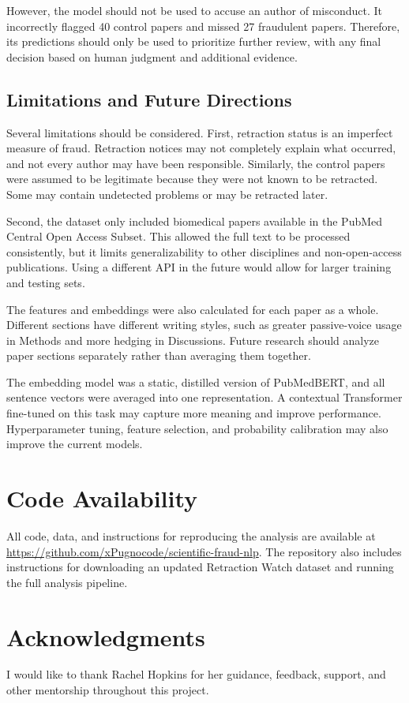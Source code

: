 \documentclass[11pt,letterpaper]{article}
\begin{document}
However, the model should not be used to accuse an author of misconduct. It incorrectly flagged 40 control papers and missed 27 fraudulent papers. Therefore, its predictions should only be used to prioritize further review, with any final decision based on human judgment and additional evidence.

\subsection{Limitations and Future Directions}

Several limitations should be considered. First, retraction status is an imperfect measure of fraud. Retraction notices may not completely explain what occurred, and not every author may have been responsible. Similarly, the control papers were assumed to be legitimate because they were not known to be retracted. Some may contain undetected problems or may be retracted later.

Second, the dataset only included biomedical papers available in the PubMed Central Open Access Subset. This allowed the full text to be processed consistently, but it limits generalizability to other disciplines and non-open-access publications. Using a different API in the future would allow for larger training and testing sets.

The features and embeddings were also calculated for each paper as a whole. Different sections have different writing styles, such as greater passive-voice usage in Methods and more hedging in Discussions. Future research should analyze paper sections separately rather than averaging them together.

The embedding model was a static, distilled version of PubMedBERT, and all sentence vectors were averaged into one representation. A contextual Transformer fine-tuned on this task may capture more meaning and improve performance. Hyperparameter tuning, feature selection, and probability calibration may also improve the current models.

\section*{Code Availability}

All code, data, and instructions for reproducing the analysis are available at \url{https://github.com/xPugnocode/scientific-fraud-nlp}. The repository also includes instructions for downloading an updated Retraction Watch dataset and running the full analysis pipeline.

\section*{Acknowledgments}

I would like to thank Rachel Hopkins for her guidance, feedback, support, and other mentorship throughout this project.




\clearpage
\appendix


\end{document}
